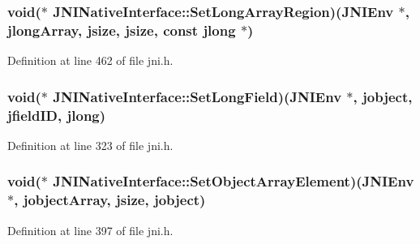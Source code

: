 \hypertarget{struct_j_n_i_native_interface_a2cc9a44a9450c621ab3d84eb96081736}{
\subsubsection[{Set\-Long\-Array\-Region}]{\setlength{\rightskip}{0pt plus 5cm}void($\ast$ J\-N\-I\-Native\-Interface\-::\-Set\-Long\-Array\-Region)({\bf J\-N\-I\-Env} $\ast$, {\bf jlong\-Array}, {\bf jsize}, {\bf jsize}, const {\bf jlong} $\ast$)}}\label{struct_j_n_i_native_interface_a2cc9a44a9450c621ab3d84eb96081736}


Definition at line 462 of file jni.\-h.

\hypertarget{struct_j_n_i_native_interface_a5f8876c50209d628552edb4476e95c38}{
\subsubsection[{Set\-Long\-Field}]{\setlength{\rightskip}{0pt plus 5cm}void($\ast$ J\-N\-I\-Native\-Interface\-::\-Set\-Long\-Field)({\bf J\-N\-I\-Env} $\ast$, {\bf jobject}, {\bf jfield\-I\-D}, {\bf jlong})}}\label{struct_j_n_i_native_interface_a5f8876c50209d628552edb4476e95c38}


Definition at line 323 of file jni.\-h.

\hypertarget{struct_j_n_i_native_interface_a95d2737d4629646bdab91789b514675e}{
\subsubsection[{Set\-Object\-Array\-Element}]{\setlength{\rightskip}{0pt plus 5cm}void($\ast$ J\-N\-I\-Native\-Interface\-::\-Set\-Object\-Array\-Element)({\bf J\-N\-I\-Env} $\ast$, {\bf jobject\-Array}, {\bf jsize}, {\bf jobject})}}\label{struct_j_n_i_native_interface_a95d2737d4629646bdab91789b514675e}


Definition at line 397 of file jni.\-h.

